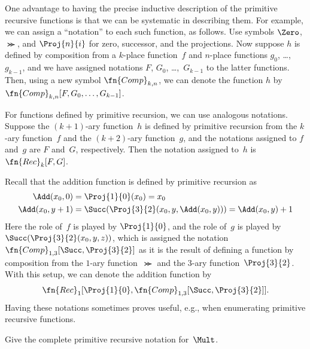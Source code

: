 \documentclass[../../../include/open-logic-section]{subfiles}
\begin{document}

One advantage to having the precise inductive description of the primitive
recursive functions is that we can be systematic in describing them.
For example, we can assign a ``notation'' to each such function, as
follows. Use symbols $\Zero$, $\Succ$, and $\Proj{n}{i}$ for zero,
successor, and the projections. Now suppose $h$ is defined by
composition from a $k$-place function~$f$ and $n$-place functions $g_0$,
\dots,~$g_{k-1}$, and we have assigned notations $F$, $G_0$,
\dots,~$G_{k-1}$ to the latter functions. Then, using a new symbol
$\fn{Comp}_{k,n}$, we can denote the function $h$ by
$\fn{Comp}_{k,n}[F,G_0,\dots,G_{k-1}]$. 

For functions defined by primitive recursion, we can use analogous
notations. Suppose the $(k+1)$-ary function~$h$ is defined by
primitive recursion from the $k$-ary function~$f$ and the $(k+2)$-ary
function~$g$, and the notations assigned to $f$ and~$g$ are $F$
and~$G$, respectively. Then the notation assigned to~$h$ is
$\fn{Rec}_k[F,G]$. 

Recall that the addition function is defined by primitive recursion as
\begin{align*}
  \Add(x_0, 0) & = \Proj{1}{0}(x_0) = x_0\\
  \Add(x_0, y+1) & = \Succ(\Proj{3}{2}(x_0, y, \Add(x_0, y))) = \Add(x_0, y) +1
\end{align*}
Here the role of~$f$ is played by $\Proj{1}{0}$, and the role of~$g$
is played by $\Succ(\Proj{3}{2}(x_0, y, z))$, which is assigned the
notation $\fn{Comp}_{1,3}[\Succ,\Proj{3}{2}]$ as it is the result of
defining a function by composition from the $1$-ary function~$\Succ$
and the $3$-ary function~$\Proj{3}{2}$. With this setup, we can denote
the addition function by
\[
\fn{Rec}_1[\Proj{1}{0},\fn{Comp}_{1,3}[\Succ,\Proj{3}{2}]].
\]
Having these notations sometimes proves useful, e.g., when enumerating
primitive recursive functions.

\begin{prob}
  Give the complete primitive recursive notation for~$\Mult$.
\end{prob}
\end{document}
